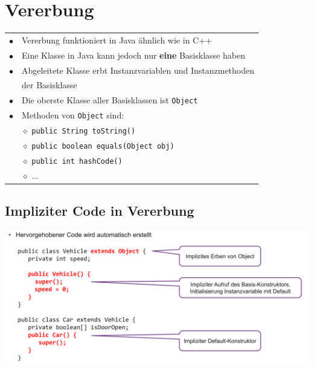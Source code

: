 {\small
\section{Vererbung}
    \begin{tabular}{ll}
        $\bullet$ & Vererbung funktioniert in Java ähnlich wie in C++\\
        $\bullet$ & Eine Klasse in Java kann jedoch nur \textbf{eine} Basisklasse haben\\
        $\bullet$ & Abgeleitete Klasse erbt Instanzvariablen und Instanzmethoden\\
                  & der Basisklasse\\
        $\bullet$ & Die oberste Klasse aller Basisklassen ist \verb|Object|\\
        $\bullet$ & Methoden von \verb|Object| sind: \\
                  & $\diamond$ \verb|public String toString()| \\
                  & $\diamond$ \verb|public boolean equals(Object obj)| \\
                  & $\diamond$ \verb|public int hashCode()| \\
                  & $\diamond$ ... \\
    \end{tabular}

\columnbreak

\subsection{Impliziter Code in Vererbung}
    \begin{center}
        \includegraphics[width=0.9\columnwidth]{pictures/vererbung-implizit.png}
    \end{center}
    \vspace{-0.5cm}

}
